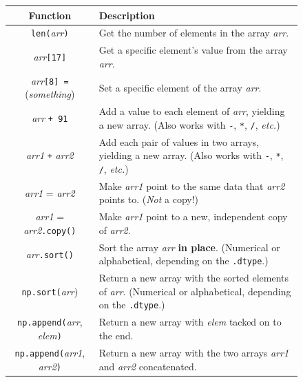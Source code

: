 \begin{figure}[ht]
\centering
\footnotesize
\begingroup
\par\tagpdfparaOff
{}
\begin{tabular}{c|p{3.1in}}
Function & Description \\
\hline

\texttt{len(}\textsl{arr}\texttt{)} & Get the number of elements in the array \textsl{arr}. \\

\textsl{arr}\texttt{[17]} & Get a specific element's value from the array \textsl{arr}. \\

\textsl{arr}\texttt{[8] =} (\textsl{something}) & Set a specific element of the array \textsl{arr}. \\

\textsl{arr} \texttt{+ 91} & Add a value to each element of \textsl{arr},
yielding a new array. (Also works with \texttt{-}, \texttt{*}, \texttt{/},
\textit{etc.}) \\

\textsl{arr1} \texttt{+} \textsl{arr2} & Add each pair of values in two arrays,
yielding a new array. (Also works with \texttt{-}, \texttt{*}, \texttt{/},
\textit{etc.}) \\

\textsl{arr1} = \textsl{arr2} & Make \textsl{arr1} point to the same data that
\textsl{arr2} points to. (\textit{Not} a copy!)\\

\textsl{arr1} = \textsl{arr2}\texttt{.copy()} & Make \textsl{arr1} point to a
new, independent copy of \textsl{arr2}. \\

\textsl{arr}\texttt{.sort()} & Sort the array \textsl{arr} \textbf{in place}. (Numerical or
alphabetical, depending on the \texttt{.dtype}.) \\

\texttt{np.sort(}\textsl{arr}) & Return a new array with the sorted elements
of \textsl{arr}. (Numerical or alphabetical, depending on the \texttt{.dtype}.)
\\

\texttt{np.append(}\textsl{arr}, \textsl{elem}\texttt{)} &
    Return a new array with \textsl{elem} tacked on to the end. \\

\texttt{np.append(}\textsl{arr1}, \textsl{arr2}\texttt{)} &
    Return a new array with the two arrays \textsl{arr1} and \textsl{arr2} concatenated. \\


\end{tabular}
\end{figure}
